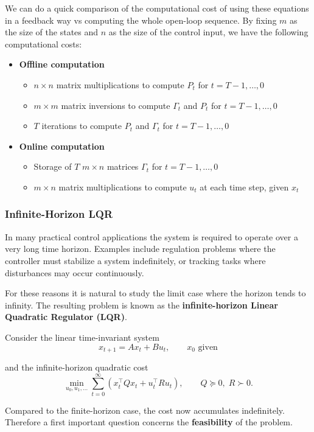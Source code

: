 We can do a quick comparison of the computational cost of using these equations in a feedback way vs computing the whole open-loop sequence. By fixing $m$ as the size of the states and $n$ as the size of the control input, we have the following computational costs:
\begin{itemize}
    \item \textbf{Offline computation}
    \begin{itemize}
        \item $n\times n$ matrix multiplications to compute $P_t$ for $t=T-1,\dots,0$
        \item $m\times m$ matrix inversions to compute $\Gamma_t$ and $P_t$ for $t=T-1,\dots,0$
        \item $T$ iterations to compute $P_t$ and $\Gamma_t$ for $t=T-1,\dots,0$
    \end{itemize}
    \item \textbf{Online computation}
    \begin{itemize}
        \item Storage of $T$ $m\times n$ matrices $\Gamma_t$ for $t=T-1,\dots,0$
        \item $m\times n$ matrix multiplications to compute $u_t$ at each time step, given $x_t$
    \end{itemize}
\end{itemize}

\subsubsection{Infinite-Horizon LQR}

In many practical control applications the system is required to operate
over a very long time horizon.  
Examples include regulation problems where the controller must stabilize
a system indefinitely, or tracking tasks where disturbances may occur
continuously.

For these reasons it is natural to study the limit case where the horizon
tends to infinity. The resulting problem is known as the
\textbf{infinite-horizon Linear Quadratic Regulator (LQR)}.

Consider the linear time-invariant system
\[
x_{t+1} = A x_t + B u_t, \qquad x_0 \text{ given}
\]

and the infinite-horizon quadratic cost
\[
\min_{u_0,u_1,\dots}
\sum_{t=0}^{\infty}
\left(
x_t^\top Q x_t + u_t^\top R u_t
\right),
\qquad Q \succeq 0, \; R \succ 0 .
\]

Compared to the finite-horizon case, the cost now accumulates
indefinitely. Therefore a first important question concerns the
\textbf{feasibility} of the problem.

